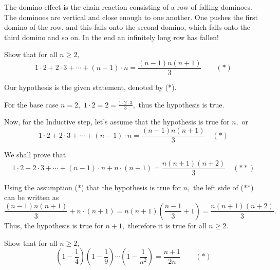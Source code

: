 \documentclass{article}
\begin{document}
The domino effect is the chain reaction consisting of a row of falling dominoes.
The dominoes are vertical and close enough to one another.
One pushes the first domino of the row, and this falls onto the second domino, which falls onto the third domino and so on.
In the end an infinitely long row has fallen!

\newpage

\begin{example}
    Show that for all $n \ge 2,$
    \[
        1 \cdot 2 + 2 \cdot 3 + \cdots + (n -1) \cdot n = \frac{(n-1)n(n+1)}{3} \qquad (*)
    \]
\end{example}

\begin{soln}
    Our hypothesis is the given statement, denoted by (*).

    For the base case $n=2,$ $1 \cdot 2 = 2 = \frac{1\cdot 2 \cdot 3}{3},$ thus the hypothesis is true.
    
    Now, for the Inductive step, let's assume that the hypothesis is true for $n,$ or
    \[
        1 \cdot 2 + 2 \cdot 3 + \cdots + (n -1) \cdot n = \frac{(n-1)n(n+1)}{3} \quad (*)
    \]

    We shall prove that
    \[
        1 \cdot 2 + 2 \cdot 3 + \cdots + (n -1) \cdot n +  n\cdot (n+1) = \frac{n(n+1)(n+2)}{3} \quad (**)
    \]

    Using the assumption (*) that the hypothesis is true for $n,$ the left side of (**) can be written as
    \[
        \frac{(n-1)n(n+1)}{3} +  n\cdot (n+1) = n(n+1) \left( \frac{n-1}{3} + 1 \right) = \frac{n(n+1)(n+2)}{3}.
    \]
    Thus, the hypothesis is true for $n+1,$ therefore it is true for all $n \ge 2.$
\end{soln}

\begin{example}
    Show that for all $n \ge 2,$
    \[
        \left(1 - \frac{1}{4}\right) \left(1 - \frac{1}{9}\right) \cdots \left(1 - \frac{1}{n^2}\right) = \frac{n+1}{2n} \qquad (*)
    \]
\end{example}
\end{document}
